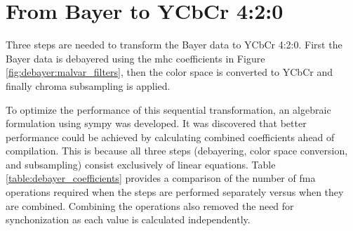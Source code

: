 \section{From Bayer to YCbCr 4:2:0}
\label{sec:bayertoycbcr}
Three steps are needed to transform the Bayer data to YCbCr 4:2:0.
First the Bayer data is debayered using the \gls{mhc} coefficients in Figure \ref{fig:debayer:malvar_filters}, then the color space is converted to YCbCr and finally chroma subsampling is applied.

To optimize the performance of this sequential transformation, an algebraic formulation using \gls{sympy} was developed.
It was discovered that better performance could be achieved by calculating combined coefficients ahead of compilation.
This is because all three steps (debayering, color space conversion, and subsampling) consist exclusively of linear equations.
Table \ref{table:debayer_coefficients} provides a comparison of the number of \gls{fma} operations required when the steps are performed separately versus when they are combined.
Combining the operations also removed the need for synchonization as each value is calculated independently.


